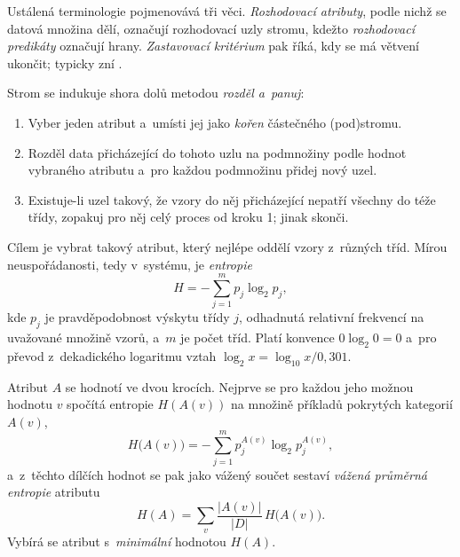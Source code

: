 \documentclass[11pt,a4paper]{article}
\theoremstyle{definition}
\begin{document}
Ustálená terminologie pojmenovává tři věci. \emph{Rozhodovací atributy}, podle nichž se
datová množina dělí, označují rozhodovací uzly stromu, kdežto \emph{rozhodovací predikáty}
označují hrany. \emph{Zastavovací kritérium} pak říká, kdy se má větvení ukončit; typicky
zní .

\begin{defbox}
Strom se indukuje shora dolů metodou \emph{rozděl a~panuj}:
\begin{enumerate}
\item Vyber jeden atribut a~umísti jej jako \emph{kořen} částečného (pod)stromu.
\item Rozděl data přicházející do tohoto uzlu na podmnožiny podle hodnot vybraného atributu
      a~pro každou podmnožinu přidej nový uzel.
\item Existuje-li uzel takový, že vzory do něj přicházející nepatří všechny do téže třídy,
      zopakuj pro něj celý proces od kroku 1; jinak skonči.
\end{enumerate}
\end{defbox}

\begin{defbox}
Cílem je vybrat takový atribut, který nejlépe oddělí vzory z~různých tříd. Mírou
neuspořádanosti, tedy  v~systému, je \emph{entropie}
\[ H=-\sum_{j=1}^{m}p_j\log_2 p_j, \]
kde $p_j$ je pravděpodobnost výskytu třídy $j$, odhadnutá relativní frekvencí na uvažované
množině vzorů, a~$m$ je počet tříd. Platí konvence $0\log_2 0=0$ a~pro převod z~dekadického
logaritmu vztah $\log_2 x=\log_{10}x/0{,}301$.

Atribut $A$ se hodnotí ve dvou krocích. Nejprve se pro každou jeho možnou hodnotu $v$
spočítá entropie $H(A(v))$ na množině příkladů pokrytých kategorií $A(v)$,
\[ H\big(A(v)\big)=-\sum_{j=1}^{m}p_j^{A(v)}\log_2 p_j^{A(v)}, \]
a~z~těchto dílčích hodnot se pak jako vážený součet sestaví \emph{vážená průměrná entropie}
atributu
\[ H(A)=\sum_{v}\frac{|A(v)|}{|D|}\,H\big(A(v)\big). \]
Vybírá se atribut s~\emph{minimální} hodnotou $H(A)$.
\end{defbox}
\end{document}
